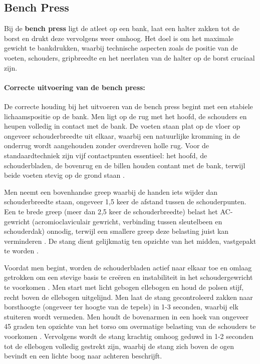 \subsection{Bench Press}
\label{subsec:bench-press}
Bij de \textbf{bench press} ligt de atleet op een bank, laat een halter zakken tot de borst en drukt deze vervolgens weer omhoog. 
Het doel is om het maximale gewicht te bankdrukken, waarbij technische aspecten zoals de positie van de voeten, schouders, gripbreedte en het neerlaten van de halter op de borst cruciaal zijn.

\paragraph{Correcte uitvoering van de bench press:}
De correcte houding bij het uitvoeren van de bench press begint met een stabiele lichaamspositie op de bank. 
Men ligt op de rug met het hoofd, de schouders en heupen volledig in contact met de bank. 
De voeten staan plat op de vloer op ongeveer schouderbreedte uit elkaar, waarbij een natuurlijke kromming in de onderrug wordt aangehouden zonder overdreven holle rug. 
Voor de standaardtechniek zijn vijf contactpunten essentieel: het hoofd, de schouderbladen, de bovenrug en de billen houden contant met de bank, terwijl beide voeten stevig op de grond staan \autocite{KrolEtAl2010}.

\medskip

Men neemt een bovenhandse greep waarbij de handen iets wijder dan schouderbreedte staan, ongeveer 1,5 keer de afstand tussen de schouderpunten. 
Een te brede greep (meer dan 2,5 keer de schouderbreedte) belast het AC-gewricht (acromioclaviculair gewricht, verbinding tussen sleutelbeen en schouderdak) onnodig, terwijl een smallere greep deze belasting juist kan verminderen \autocite{Ronai2018}. 
De stang dient gelijkmatig ten opzichte van het midden, vastgepakt te worden \autocite{KrolEtAl2010}.

\medskip

Voordat men begint, worden de schouderbladen actief naar elkaar toe en omlaag getrokken om een stevige basis te creëren en instabiliteit in het schoudergewricht te voorkomen \autocite{NoteboomEtAl2024}. 
Men start met licht gebogen ellebogen en houd de polsen stijf, recht boven de ellebogen uitgelijnd. 
Men laat de stang gecontroleerd zakken naar borsthoogte (ongeveer ter hoogte van de tepels) in 1-3 seconden, waarbij elk stuiteren wordt vermeden. 
Men houdt de bovenarmen in een hoek van ongeveer 45 graden ten opzichte van het torso om overmatige belasting van de schouders te voorkomen \autocite{Ronai2018}. 
Vervolgens wordt de stang krachtig omhoog geduwd in 1-2 seconden tot de ellebogen volledig gestrekt zijn, waarbij de stang zich boven de ogen bevindt en een lichte boog naar achteren beschrijft.

